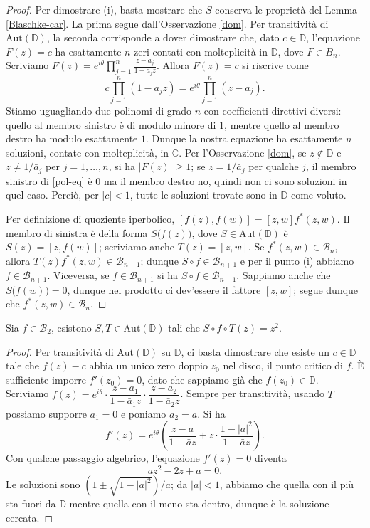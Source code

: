 \begin{proof}
  Per dimostrare (i), basta mostrare che $S$ conserva le proprietà del Lemma \ref{Blaschke-car}. La prima segue dall'Osservazione \ref{dom}. Per transitività di $\text{Aut}(\mathbb{D})$, la seconda corrisponde a dover dimostrare che, dato $c \in \mathbb{D}$, l'equazione $F(z)=c$ ha esattamente $n$ zeri contati con molteplicità in $\mathbb{D}$, dove $F \in B_n$. Scriviamo $F(z)=\displaystyle e^{i\theta}\prod_{j=1}^n \frac{z-a_j}{1-\bar{a}_jz}$. Allora $F(z)=c$ si riscrive come
  \begin{equation} \label{pol-eq}
    c\prod_{j=1}^n (1-\bar{a}_jz)=e^{i\theta}\prod_{j=1}^n(z-a_j).
  \end{equation}
  Stiamo uguagliando due polinomi di grado $n$ con coefficienti direttivi diversi: quello al membro sinistro è di modulo minore di $1$, mentre quello al membro destro ha modulo esattamente $1$. Dunque la nostra equazione ha esattamente $n$ soluzioni, contate con molteplicità, in $\mathbb{C}$.
  Per l'Osservazione \ref{dom}, se $z \not\in \mathbb{D}$ e $z\not=1/\bar{a}_j$ per $j=1,\dots,n$, si ha $|F(z)| \ge 1$; se $z=1/\bar{a}_j$ per qualche $j$, il membro sinistro di \eqref{pol-eq} è $0$ ma il membro destro no, quindi non ci sono soluzioni in quel caso. Perciò, per $|c|<1$, tutte le soluzioni trovate sono in $\mathbb{D}$ come voluto.

  Per definizione di quoziente iperbolico, $[f(z),f(w)]=[z,w]f^*(z,w)$. Il membro di sinistra è della forma $S\bigl(f(z)\bigr)$, dove $S \in \text{Aut}(\mathbb{D})$ è $S(z)=[z,f(w)]$; scriviamo anche $T(z)=[z,w]$.
  Se $f^*(z,w) \in \mathcal{B}_n$, allora $T(z)f^*(z,w) \in \mathcal{B}_{n+1}$; dunque $S\circ f \in \mathcal{B}_{n+1}$ e per il punto (i) abbiamo $f \in \mathcal{B}_{n+1}$. Viceversa, se $f \in \mathcal{B}_{n+1}$ si ha $S\circ f \in \mathcal{B}_{n+1}$.
  Sappiamo anche che $S\bigl(f(w)\bigr)=0$, dunque nel prodotto ci dev'essere il fattore $[z,w]$; segue dunque che $f^*(z,w) \in \mathcal{B}_n$.
\end{proof}

\begin{lm} \label{z^2}
  Sia $f \in \mathcal{B}_2$, esistono $S, T \in \text{Aut}(\mathbb{D})$ tali che $S\circ f\circ T(z)=z^2$.
\end{lm}

\begin{proof}
  Per transitività di $\text{Aut}(\mathbb{D})$ su $\mathbb{D}$, ci basta dimostrare che esiste un $c \in \mathbb{D}$ tale che $f(z)-c$ abbia un unico zero doppio $z_0$ nel disco, il punto critico di $f$. È sufficiente imporre $f'(z_0)=0$, dato che sappiamo già che $f(z_0) \in \mathbb{D}$. Scriviamo $f(z)=e^{i\theta}\cdot\dfrac{z-a_1}{1-\bar{a}_1z}\cdot\dfrac{z-a_2}{1-\bar{a}_2z}$.
  Sempre per transitività, usando $T$ possiamo supporre $a_1=0$ e poniamo $a_2=a$. Si ha
  $$f'(z)=e^{i\theta}\left(\frac{z-a}{1-\bar{a}z}+z\cdot\frac{1-|a|^2}{1-\bar{a}z}\right).$$
  Con qualche passaggio algebrico, l'equazione $f'(z)=0$ diventa
  $$\bar{a}z^2-2z+a=0.$$
  Le soluzioni sono $(1 \pm \sqrt{1-|a|^2})/\bar{a}$; da $|a|<1$, abbiamo che quella con il più sta fuori da $\mathbb{D}$ mentre quella con il meno sta dentro, dunque è la soluzione cercata.
\end{proof}

